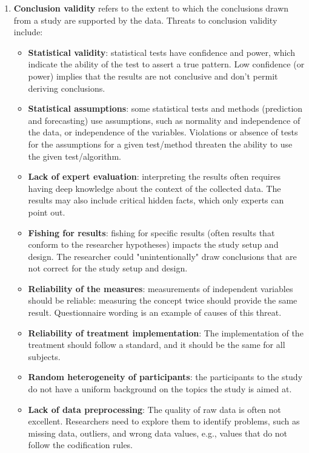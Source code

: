 \begin{enumerate}
    
    \item \textbf{Conclusion validity} refers to the extent to which the conclusions drawn from a study are supported by the data. 
    Threats to conclusion validity include:
    \begin{itemize}
        \item \textbf{Statistical validity}: statistical tests have confidence and power, which indicate the ability of the test to assert a true pattern. Low confidence (or power) implies that the results are not conclusive and don't permit deriving conclusions.
        \item \textbf{Statistical assumptions}: some statistical tests and methods (\eg prediction and forecasting) use assumptions, such as normality and independence of the data, or independence of the variables. Violations or absence of tests for the assumptions for a given test/method threaten the ability to use the given test/algorithm.
        \item \textbf{Lack of expert evaluation}: interpreting the results often requires having deep knowledge about the context of the collected data. The results may also include critical hidden facts, which only experts can point out.
        \item \textbf{Fishing for results}: fishing for specific results (often results that conform to the researcher hypotheses) impacts the study setup and design. The researcher could "unintentionally" draw conclusions that are not correct for the study setup and design.
        \item \textbf{Reliability of the measures}: measurements of independent variables should be reliable: measuring the concept twice should provide the same result. Questionnaire wording is an example of causes of this threat.
        \item \textbf{Reliability of treatment implementation}: The implementation of the treatment should follow a standard, and it should be the same for all subjects.
        \item \textbf{Random heterogeneity of participants}: the participants to the study do not have a uniform background on the topics the study is aimed at.
        \item \textbf{Lack of data preprocessing}: The quality of raw data is often not excellent. Researchers need to explore them to identify problems, such as missing data, outliers, and wrong data values, e.g., values that do not follow the codification rules.
    \end{itemize}
\end{enumerate}

